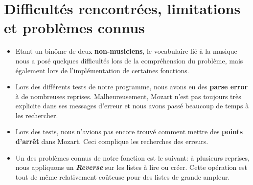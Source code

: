 \documentclass[a4paper,12pt]{report}
\begin{document}
\section*{Difficultés rencontrées, limitations et problèmes connus}
\begin{itemize}
\item Etant un binôme de deux \textbf{non-musiciens}, le vocabulaire lié à la musique nous a posé quelques difficultés lors de la compréhension du problème, mais également lors de l'implémentation de certaines fonctions.

\item Lors des différents tests de notre programme, nous avons eu des \textbf{parse error} à de nombreuses reprises.  Malheureusement, Mozart n'est pas toujours très explicite dans ses messages d'erreur et nous avons passé beaucoup de temps à les rechercher. 
 
\item Lors des tests, nous n'avions pas encore trouvé comment mettre des \textbf{points d'arrêt} dans Mozart. Ceci complique les recherches des erreurs.

\item Un des problèmes connus de notre fonction est le suivant: à plusieurs reprises, nous appliquons un \textit{\textbf{Reverse}} sur les listes à lire ou créer. Cette opération est tout de même relativement coûteuse pour des listes de grande ampleur.  

 
\end{itemize}
\end{document}

